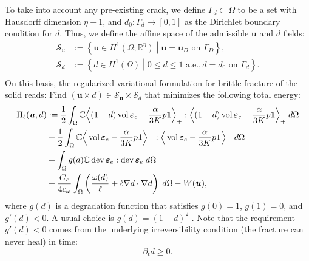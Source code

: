 To take into account any pre-existing crack, we define $\Gamma_d\subset\overline{\Omega}$ to be a set with Hausdorff dimension $\eta-1$, and $d_0:\Gamma_d\rightarrow[0,1]$ as the Dirichlet boundary condition for $d$. Thus, we define the affine space of the admissible $\bm{u}$ and $d$ fields:
\begin{equation}\label{Eq:Dissipative_admissible}
\begin{aligned}
\mathscr{S}_u &:= \left\{\bm{u}\in H^1\left(\Omega; \mathbb{R}^\eta\right) \middle|
\bm{u} = \bm{u}_D \text{ on } \Gamma_D
\right\}, \\
\mathscr{S}_d &:= \left\{d\in H^1(\Omega) \middle|
0 \le d \le 1 \text{ a.e.}, d = d_0 \text{ on } \Gamma_d
\right\}. \\
\end{aligned}
\end{equation}
On this basis, the regularized variational formulation for brittle fracture of the solid reads: Find $\left(\bm{u}\times d \right)\in\mathscr{S}_{\bm{u}}\times\mathscr{S}_d$ that minimizes the following total energy:
\begin{equation}\label{Eq:Dissipative_functional}
\begin{aligned}
\Pi_{\ell}(\bm{u},d)&:= \frac12 \int_{\Omega} \mathbb{C}\Big\langle(1-d)\operatorname{vol}\bm{\varepsilon}_e-\frac{\alpha}{3K}p\mathbf{1}\Big\rangle_{+}:\Big\langle(1-d)\operatorname{vol}\bm{\varepsilon}_e-\frac{\alpha}{3K}p\mathbf{1}\Big\rangle_{+}\; d\Omega \\&+
\frac12\int_{\Omega}\mathbb{C}\Big\langle\operatorname{vol}\bm{\varepsilon}_e-\frac{\alpha}{3K}p\mathbf{1}\Big\rangle_{-}:\Big\langle\operatorname{vol}\bm{\varepsilon}_e-\frac{\alpha}{3K}p\mathbf{1}\Big\rangle_{-}\; d\Omega \\&+
\int_{\Omega} g(d)\mathbb{C}\operatorname{dev}\bm{\varepsilon}_e:\operatorname{dev}\bm{\varepsilon}_e\; d\Omega\\&+
\frac{G_c}{4c_{\omega}}\int_\Omega \left(\frac{\omega(d)}{\ell} + \ell \nabla d\cdot\nabla d\right)\;d\Omega- W(\bm{u}),
\end{aligned}
\end{equation}
where $g(d)$ is a degradation function that satisfies $g(0)=1$, $g(1)=0$, and $g'(d)<0$. A usual choice is $g(d)=(1-d)^2$ \cite{Bourdin2000797}. Note that the requirement $g'(d)<0$ comes from the underlying irreversibility condition (the fracture can never heal) in time:
\begin{equation}\label{Eq:irreversibility}
\partial_t d\geq 0.
\end{equation}
